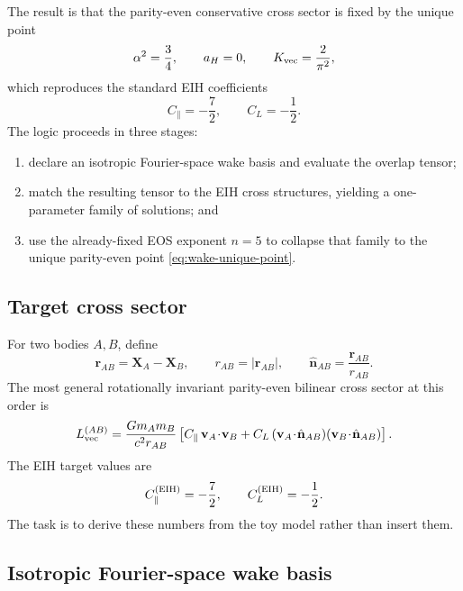 \documentclass[11pt]{article}
\newcommand{\vct}{\mathbf v}
\begin{document}
The result is that the parity-even conservative cross sector is fixed by the unique point
\begin{equation}
\alpha^2=\frac34,
\qquad
a_H=0,
\qquad
K_{\rm vec}=\frac{2}{\pi^2},
\label{eq:wake-unique-point}
\end{equation}
which reproduces the standard EIH coefficients
\begin{equation}
C_\parallel=-\frac72,
\qquad
C_L=-\frac12.
\label{eq:wake-eih-targets}
\end{equation}
The logic proceeds in three stages:
\begin{enumerate}[leftmargin=1.5em]
  \item declare an isotropic Fourier-space wake basis and evaluate the overlap tensor;
  \item match the resulting tensor to the EIH cross structures, yielding a one-parameter
  family of solutions; and
  \item use the already-fixed EOS exponent \(n=5\) to collapse that family to the unique
  parity-even point \eqref{eq:wake-unique-point}.
\end{enumerate}

\subsection{Target cross sector}
\label{sec:wake-target}

For two bodies \(A,B\), define
\begin{equation}
\mathbf r_{AB}=\mathbf X_A-\mathbf X_B,
\qquad
r_{AB}=|\mathbf r_{AB}|,
\qquad
\hat{\mathbf n}_{AB}=\frac{\mathbf r_{AB}}{r_{AB}}.
\label{eq:wake-separation-defs}
\end{equation}
The most general rotationally invariant parity-even bilinear cross sector at this order is
\begin{equation}
L_{\rm vec}^{(AB)}
=
\frac{Gm_A m_B}{c^2 r_{AB}}
\left[
C_\parallel\,\vct_A\!\cdot\!\vct_B
+
C_L\,(\vct_A\!\cdot\!\hat{\mathbf n}_{AB})
     (\vct_B\!\cdot\!\hat{\mathbf n}_{AB})
\right].
\label{eq:wake-general-cross}
\end{equation}
The EIH target values are
\begin{equation}
C_\parallel^{\rm(EIH)}=-\frac72,
\qquad
C_L^{\rm(EIH)}=-\frac12.
\label{eq:wake-eih-target}
\end{equation}
The task is to derive these numbers from the toy model rather than insert them.

\subsection{Isotropic Fourier-space wake basis}
\label{sec:wake-basis}
\end{document}
